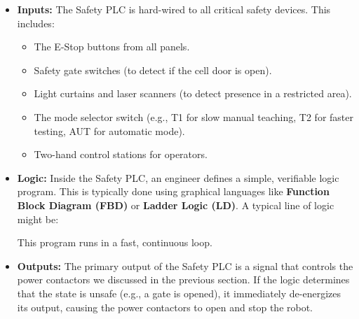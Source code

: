 \begin{itemize}
    \item \textbf{Inputs:} The Safety PLC is hard-wired to all critical safety devices. This includes:
    \begin{itemize}
        \item The E-Stop buttons from all panels.
        \item Safety gate switches (to detect if the cell door is open).
        \item Light curtains and laser scanners (to detect presence in a restricted area).
        \item The mode selector switch (e.g., T1 for slow manual teaching, T2 for faster testing, AUT for automatic mode).
        \item Two-hand control stations for operators.
    \end{itemize}
    \item \textbf{Logic:} Inside the Safety PLC, an engineer defines a simple, verifiable logic program. This is typically done using graphical languages like \textbf{Function Block Diagram (FBD)} or \textbf{Ladder Logic (LD)}. A typical line of logic might be:
    

    This program runs in a fast, continuous loop.
    
    \item \textbf{Outputs:} The primary output of the Safety PLC is a signal that controls the power contactors we discussed in the previous section. If the logic determines that the state is unsafe (e.g., a gate is opened), it immediately de-energizes its output, causing the power contactors to open and stop the robot.
\end{itemize}

